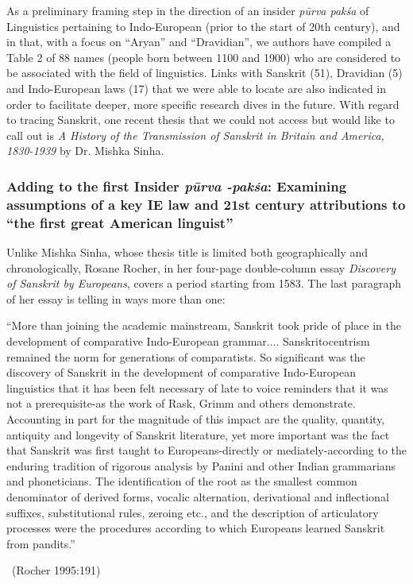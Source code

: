 As a preliminary framing step in the direction of an insider \textit{pūrva pakśa} of Linguistics pertaining to Indo-European (prior to the start of 20th century), and in that, with a focus on “Aryan” and “Dravidian”, we authors have compiled a Table 2 of 88 names (people born between 1100 and 1900) who are considered to be associated with the field of linguistics. Links with Sanskrit (51), Dravidian (5) and Indo-European laws (17) that we were able to locate are also indicated in order to facilitate deeper, more specific research dives in the future. With regard to tracing Sanskrit, one recent thesis that we could not access but would like to call out is \textit{A History of the Transmission of Sanskrit in Britain and America, 1830-1939} by Dr. Mishka Sinha.


\subsubsection{Adding to the first Insider \textit{pūrva -pakśa}: Examining assumptions of a key IE law and 21st century attributions to “the first great American linguist”}

Unlike Mishka Sinha, whose thesis title is limited both geographically and chronologically, Rosane Rocher, in her four-page double-column essay \textit{Discovery of Sanskrit by Europeans}, covers a period starting from 1583. The last paragraph of her essay is telling in ways more than one:

\begin{myquote}
“More than joining the academic mainstream, Sanskrit took pride of place in the development of comparative Indo-European grammar.... Sanskritocentrism remained the norm for generations of comparatists. So significant was the discovery of Sanskrit in the development of comparative Indo-European linguistics that it has been felt necessary of late to voice reminders that it was not a prerequisite-as the work of Rask, Grimm and others demonstrate. Accounting in part for the magnitude of this impact are the quality, quantity, antiquity and longevity of Sanskrit literature, yet more important was the fact that Sanskrit was first taught to Europeans-directly or mediately-according to the enduring tradition of rigorous analysis by Panini and other Indian grammarians and phoneticians. The identification of the root as the smallest common denominator of derived forms, vocalic alternation, derivational and inflectional suffixes, substitutional rules, zeroing etc., and the description of articulatory processes were the procedures according to which Europeans learned Sanskrit from pandits.”

~\hfill (Rocher 1995:191)
\end{myquote}

